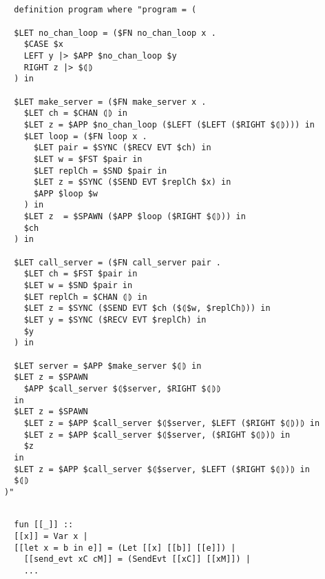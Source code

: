 \documentclass{article}
\begin{document}
\begin{lstlisting}[style=codestyle1, escapechar=\%]


  definition program where "program = (

  $LET no_chan_loop = ($FN no_chan_loop x .
    $CASE $x
    LEFT y |> $APP $no_chan_loop $y
    RIGHT z |> $⦇⦈
  ) in

  $LET make_server = ($FN make_server x .
    $LET ch = $CHAN ⦇⦈ in
    $LET z = $APP $no_chan_loop ($LEFT ($LEFT ($RIGHT $⦇⦈))) in
    $LET loop = ($FN loop x .
      $LET pair = $SYNC ($RECV EVT $ch) in
      $LET w = $FST $pair in
      $LET replCh = $SND $pair in 
      $LET z = $SYNC ($SEND EVT $replCh $x) in
      $APP $loop $w
    ) in
    $LET z  = $SPAWN ($APP $loop ($RIGHT $⦇⦈)) in
    $ch
  ) in

  $LET call_server = ($FN call_server pair .
    $LET ch = $FST $pair in
    $LET w = $SND $pair in
    $LET replCh = $CHAN ⦇⦈ in
    $LET z = $SYNC ($SEND EVT $ch ($⦇$w, $replCh⦈)) in
    $LET y = $SYNC ($RECV EVT $replCh) in
    $y
  ) in

  $LET server = $APP $make_server $⦇⦈ in
  $LET z = $SPAWN
    $APP $call_server $⦇$server, $RIGHT $⦇⦈⦈
  in
  $LET z = $SPAWN
    $LET z = $APP $call_server $⦇$server, $LEFT ($RIGHT $⦇⦈)⦈ in
    $LET z = $APP $call_server $⦇$server, ($RIGHT $⦇⦈)⦈ in
    $z
  in
  $LET z = $APP $call_server $⦇$server, $LEFT ($RIGHT $⦇⦈)⦈ in
  $⦇⦈
)"
  \end{lstlisting}




\begin{lstlisting}[style=codestyle1, escapechar=\%]

  fun [[_]] ::
  [[x]] = Var x | 
  [[let x = b in e]] = (Let [[x] [[b]] [[e]]) |
    [[send_evt xC cM]] = (SendEvt [[xC]] [[xM]]) |
    ...
    
  \end{lstlisting}
\end{document}
